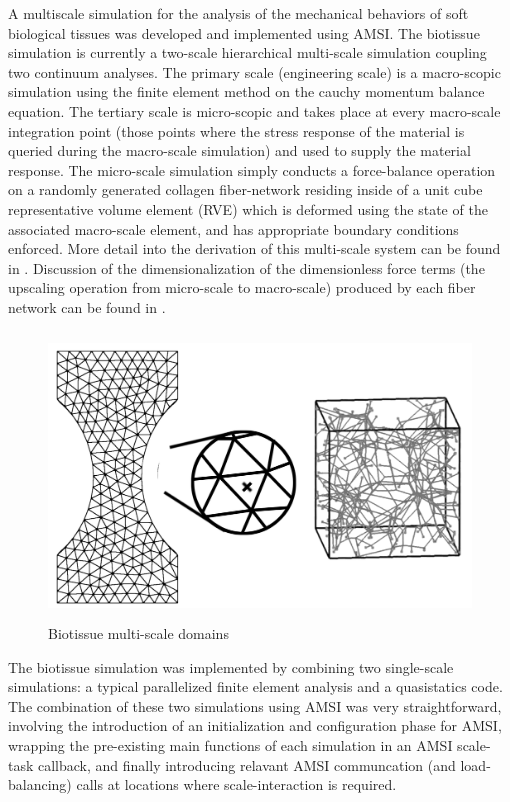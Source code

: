 A multiscale simulation for the analysis of the mechanical behaviors of soft biological tissues was developed and implemented using AMSI. The biotissue simulation is currently a two-scale hierarchical multi-scale simulation coupling two continuum analyses. The primary scale (engineering scale) is a macro-scopic simulation using the finite element method on the cauchy momentum balance equation. The tertiary scale is micro-scopic and takes place at every macro-scale integration point (those points where the stress response of the material is queried during the macro-scale simulation) and used to supply the material response. The micro-scale simulation simply conducts a force-balance operation on a randomly generated collagen fiber-network residing inside of a unit cube representative volume element (RVE) which is deformed using the state of the associated macro-scale element, and has appropriate boundary conditions enforced. More detail into the derivation of this multi-scale system can be found in \cite{stylianopoulos2008thesis} \cite{agoram2001coupled} \cite{stylianopoulos2007multiscale} . Discussion of the dimensionalization of the dimensionless force terms (the upscaling operation from micro-scale to macro-scale) produced by each fiber network can be found in \cite{stylianopoulos2007volume} \cite{chandran2007deterministic}.

\begin{figure}
  \begin{center}
    \includegraphics[height=3in]{biotissue-scales.png}
  \end{center}
  \caption{\small Biotissue multi-scale domains}
  \label{biotissue_scales}
\end{figure}

The biotissue simulation was implemented by combining two single-scale simulations: a typical parallelized finite element analysis and a quasistatics code. The combination of these two simulations using AMSI was very straightforward, involving the introduction of an initialization and configuration phase for AMSI, wrapping the pre-existing main functions of each simulation in an AMSI scale-task callback, and finally introducing relavant AMSI communcation (and load-balancing) calls at locations where scale-interaction is required. 

